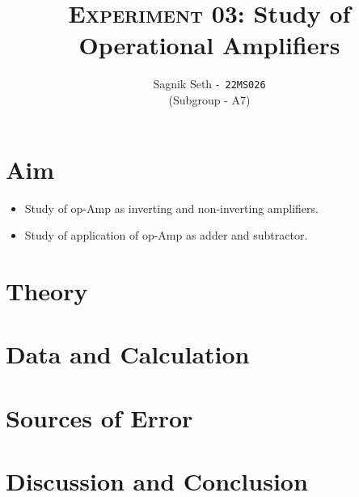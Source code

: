 \documentclass{scrartcl}
\title{
        \Large\textsc{Experiment 03: }
        \huge\textbf{Study of Operational Amplifiers} \\
}
\author{{\Large Sagnik Seth} -\   \texttt{22MS026}\\ ({\small Subgroup - A7}) }
\date{}
\begin{document}
\maketitle
\section{Aim}
\begin{itemize}
    \item Study of op-Amp as inverting and non-inverting amplifiers.
    \item Study of application of op-Amp as adder and subtractor.
\end{itemize}
\section{Theory}




\section{Data and Calculation}
\section{Sources of Error}
\section{Discussion and Conclusion} 
\end{document}
